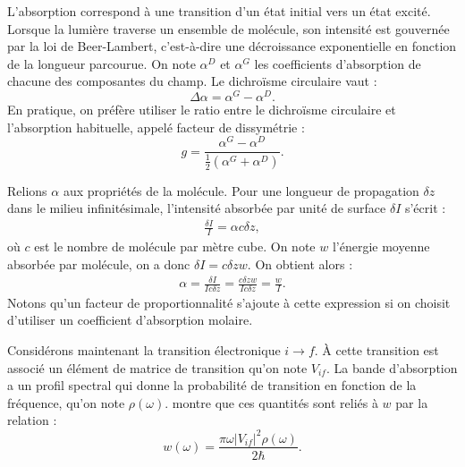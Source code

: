 L'absorption correspond à une transition d'un état initial vers un état excité. Lorsque la lumière traverse un ensemble de molécule, son intensité est gouvernée par la loi de Beer-Lambert, c'est-à-dire une décroissance exponentielle en fonction de la longueur parcourue. On note $\alpha^{D}$ et $\alpha^{G}$ les coefficients d'absorption de chacune des composantes du champ. Le dichroïsme circulaire vaut :
\[\Delta \alpha = \alpha^{G}-\alpha^{D}.\]
En pratique, on préfère utiliser le ratio entre le dichroïsme circulaire et l'absorption habituelle, appelé facteur de dissymétrie  : 
\begin{equation}
g = \frac{\alpha^{G}-\alpha^{D}}{\frac{1}{2}(\alpha^{G}+\alpha^{D})}.
\label{eq:kuhn_an}
\end{equation}

Relions $\alpha$ aux propriétés de la molécule. Pour une longueur de propagation $\delta z$ dans le milieu infinitésimale, l'intensité absorbée par unité de surface $\delta I$ s'écrit :
\begin{align*}
\frac{\delta I}{I} = \alpha c \delta z,
\end{align*}
où $c$ est le nombre de molécule par mètre cube. On note $w$ l'énergie moyenne absorbée par molécule, on a donc $\delta I = c \delta z w$. On obtient alors :
\begin{align}
\alpha = \frac{\delta I}{Ic \delta z} = \frac{c \delta z w}{Ic \delta z} = \frac{w}{I}.
\label{eq:cd1}
\end{align}
Notons qu'un facteur de proportionnalité s'ajoute à cette expression si on choisit d'utiliser un coefficient d'absorption molaire.

Considérons maintenant la transition électronique $i\rightarrow f$. \`A cette transition est associé un élément de matrice de transition qu'on note $V_{if}$. La bande d'absorption a un profil spectral qui donne la probabilité de transition en fonction de la fréquence, qu'on note $\rho(\omega)$.  montre que ces quantités sont reliés à $w$ par la relation :
\begin{equation}
w(\omega) = \frac{\pi \omega |V_{if}|^2 \rho(\omega)}{2\hbar}.
\label{eq:cd2}
\end{equation}

